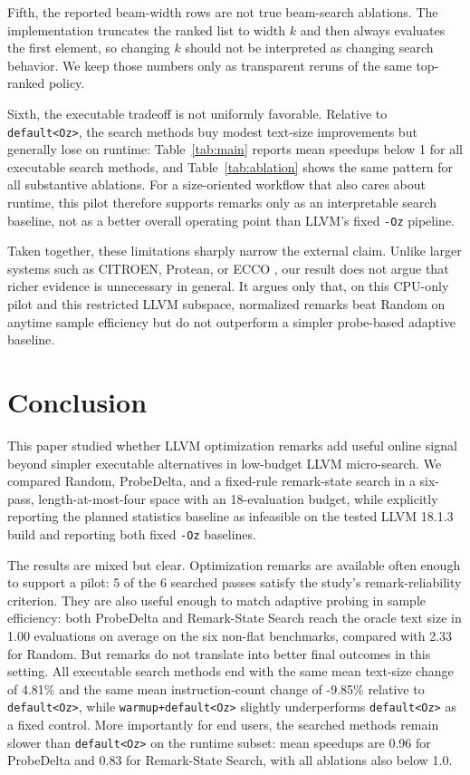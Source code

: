 \documentclass{article}
\newcommand{\method}{Remark-State Search}
\begin{document}
Fifth, the reported beam-width rows are not true beam-search ablations. The implementation truncates the ranked list to width $k$ and then always evaluates the first element, so changing $k$ should not be interpreted as changing search behavior. We keep those numbers only as transparent reruns of the same top-ranked policy.

Sixth, the executable tradeoff is not uniformly favorable. Relative to \texttt{default<Oz>}, the search methods buy modest text-size improvements but generally lose on runtime: Table~\ref{tab:main} reports mean speedups below 1 for all executable search methods, and Table~\ref{tab:ablation} shows the same pattern for all substantive ablations. For a size-oriented workflow that also cares about runtime, this pilot therefore supports remarks only as an interpretable search baseline, not as a better overall operating point than LLVM's fixed \texttt{-Oz} pipeline.

Taken together, these limitations sharply narrow the external claim. Unlike larger systems such as CITROEN, Protean, or ECCO \citep{zhao2025citroen,ashouri2026protean,pan2026ecco}, our result does not argue that richer evidence is unnecessary in general. It argues only that, on this CPU-only pilot and this restricted LLVM subspace, normalized remarks beat Random on anytime sample efficiency but do not outperform a simpler probe-based adaptive baseline.

\section{Conclusion}
\label{sec:conclusion}

This paper studied whether LLVM optimization remarks add useful online signal beyond simpler executable alternatives in low-budget LLVM micro-search. We compared Random, ProbeDelta, and a fixed-rule remark-state search in a six-pass, length-at-most-four space with an 18-evaluation budget, while explicitly reporting the planned statistics baseline as infeasible on the tested LLVM 18.1.3 build and reporting both fixed \texttt{-Oz} baselines.

The results are mixed but clear. Optimization remarks are available often enough to support a pilot: 5 of the 6 searched passes satisfy the study's remark-reliability criterion. They are also useful enough to match adaptive probing in sample efficiency: both ProbeDelta and \method{} reach the oracle text size in 1.00 evaluations on average on the six non-flat benchmarks, compared with 2.33 for Random. But remarks do not translate into better final outcomes in this setting. All executable search methods end with the same mean text-size change of 4.81\% and the same mean instruction-count change of -9.85\% relative to \texttt{default<Oz>}, while \texttt{warmup+default<Oz>} slightly underperforms \texttt{default<Oz>} as a fixed control. More importantly for end users, the searched methods remain slower than \texttt{default<Oz>} on the runtime subset: mean speedups are 0.96 for ProbeDelta and 0.83 for \method{}, with all ablations also below 1.0.
\end{document}
